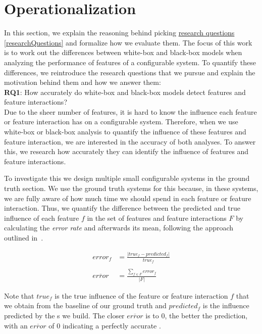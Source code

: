 \section{Operationalization}\label{ch:operationalization}

In this section, we explain the reasoning behind picking \hyperref[researchQuestions]{research questions \ref*{researchQuestions}} 
and formalize how we evaluate them. 
The focus of this work is to work out the differences between white-box and black-box models when analyzing the performance of features of a configurable system. 
To quantify these differences, we reintroduce the research questions that we pursue and explain the motivation behind them and how we answer them:\\

\noindent \textbf{RQ1}: How accurately do white-box and black-box models detect features and feature interactions? \\

Due to the sheer number of features, it is hard to know the influence each feature or feature interaction has on a configurable system. 
Therefore, when we use white-box or black-box analysis to quantify the influence of these features and feature interaction, 
we are interested in the accuracy of both analyses. 
To answer this, we research how accurately they can identify the influence of features and feature interactions.

To investigate this we design multiple small configurable systems in the ground truth section. 
We use the ground truth systems for this because, in these systems, 
we are fully aware of how much time we should spend in each feature or feature interaction. 
Thus, we quantify the difference between the predicted and true influence of each feature $f$ in the set of features and feature interactions $F$
by calculating the \emph{error rate} and afterwards its mean, following the approach outlined in~\cite{mape}. %


\begin{align}
    error_f &= \frac{\lvert true_f - predicted_f \rvert}{true_f} \label{equ:APE_RQ1} \\ \nonumber \\
    \overline{error}  &= \frac{\sum_{f \in F} error_f}{\lvert F \rvert} \label{equ:MAPE_RQ1}
\end{align}

Note that $true_f$ is the true influence of the feature or feature interaction $f$ that we obtain from the baseline of our ground truth 
and $predicted_f$ is the influence predicted by the {\perfInfluenceModel}s we build.
The closer $\overline{error}$ is to $0$, the better the prediction, with an $\overline{error}$ of 0 indicating a perfectly
accurate \perfInfluenceModel. \\


